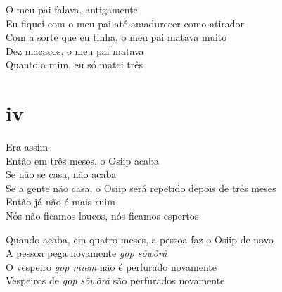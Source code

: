 \begin{linenumbers}\begingroup\raggedright
 
\noindent O meu pai falava, antigamente\\
 Eu fiquei com o meu pai até amadurecer como atirador\\
 Com a sorte que eu tinha, o meu pai matava muito\\
 Dez macacos, o meu pai matava\\
 Quanto a mim, eu só matei três
 
 
 \medskip
\section{iv}

 \noindent Era assim\\
 Então em três meses, o Osiip acaba\\
 Se não se casa, não acaba\\
 Se a gente não casa, o Osiip será repetido depois de três meses\\
 Então já não é mais ruim\\
 Nós não ficamos loucos, nós ficamos espertos
 
\end{linenumbers}\endgroup

\bigskip

\begin{linenumbers}\begingroup\raggedright
 
\noindent  Quando acaba, em quatro meses, a pessoa faz o Osiip de novo\\
 A pessoa pega novamente \emph{gop sõwõrã}\\
 O vespeiro \emph{gop miem} não é perfurado novamente\\
 Vespeiros de \emph{gop sõwõrã} são perfurados novamente
 
\end{linenumbers}\endgroup

